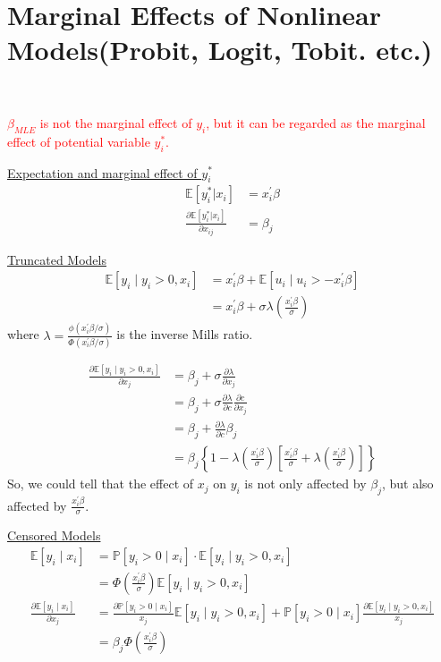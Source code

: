 \section{Marginal Effects of Nonlinear Models(Probit, Logit, Tobit. etc.)}

\begin{note}
    \ 
    
    \textcolor{red}{$\beta_{MLE}$ is not the marginal effect of $y_i$, but it can be regarded as the marginal effect of potential variable $y_i^*$.}
\end{note}

\underline{Expectation and marginal effect of $y_i^*$}
\begin{align*}
    \mathbb{E}[y_i^*|x_i] &= x_i^{\prime} \beta\\
    \frac{\partial \mathbb{E}[y_i^*|x_i]}{\partial x_{ij}} &= \beta_j
\end{align*}

\underline{Truncated Models}
\begin{align*}
    \mathbb{E}[y_i \mid y_i>0, x_i] &= x_i^{\prime} \beta + \mathbb{E}[u_i \mid u_i > -x_i^{\prime} \beta] \\
    &= x_i^{\prime} \beta +  \sigma \lambda\left(\frac{x_i^{\prime} \beta}{\sigma}\right)
\end{align*}
where $\lambda = \frac{\phi(x_i^{\prime} \beta/\sigma)}{\Phi(x_i^{\prime} \beta/\sigma)}$ is the inverse Mills ratio.

\begin{align*}
    \frac{\partial \mathbb{E}[y_i \mid y_i>0, x_i]}{\partial  x_j} &= \beta_j + \sigma \frac{\partial \lambda}{\partial x_j} \\
    &= \beta_j + \sigma \frac{\partial \lambda}{\partial c} \frac{\partial c}{\partial x_j} \\
    &= \beta_j + \frac{\partial \lambda}{\partial c} \beta_j \\
    &= \beta_j \left\{ 1 - \lambda \left(\frac{x_i^{\prime} \beta}{\sigma}\right) \left[ \frac{x_i^{\prime} \beta}{\sigma} + \lambda \left(\frac{x_i^{\prime} \beta}{\sigma}\right) \right] \right\}
\end{align*}
So, we could tell that the effect of $x_j$ on $y_i$ is not only affected by $\beta_j$, but also affected by $\frac{x_i^{\prime} \beta}{\sigma}$.

\underline{Censored Models}
\begin{align*}
    \mathbb{E}[y_i \mid x_i] &= \mathbb{P}[y_i>0 \mid x_i] \cdot \mathbb{E}[y_i \mid y_i>0, x_i] \\
    &= \Phi\left(\frac{x_i^{\prime} \beta}{\sigma}\right) \mathbb{E}[y_i \mid y_i>0, x_i] \\
    \frac{\partial \mathbb{E}[y_i \mid x_i]}{\partial x_j} &= \frac{\partial \mathbb{P}[y_i>0 \mid x_i]}{x_j} \mathbb{E}[y_i \mid y_i>0, x_i] + \mathbb{P}[y_i>0 \mid x_i] \frac{\partial \mathbb{E}[y_i \mid y_i>0, x_i]}{x_j} \\
    &= \beta_j \Phi\left(\frac{x_i^{\prime} \beta}{\sigma}\right)
\end{align*}

